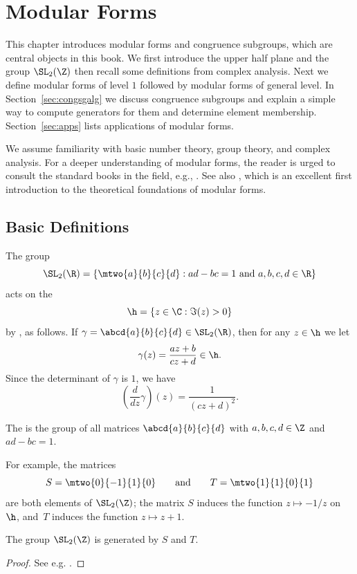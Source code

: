 \chapter{Modular Forms}\label{ch:modform}

This chapter introduces modular forms and congruence subgroups, which
are central objects in this book.  We first introduce the upper half
plane and the group $\SL_2(\Z)$ then recall some definitions from
complex analysis.  Next we define modular forms of level $1$ followed
by modular forms of general level.  In Section~\ref{sec:congsgalg} we
discuss congruence subgroups and explain a
simple way to compute generators for them and determine element
membership.  Section~\ref{sec:apps} lists applications of
modular forms.

We assume familiarity with basic number theory, group theory, and
complex analysis.  For a deeper understanding of modular forms, the
reader is urged to consult the standard books in the field, e.g.,
\cite{lang:modular, serre:arithmetic, diamond-im, miyake,
  shimura:intro, koblitz:cong}.  See also \cite{diamond-shurman},
which is an excellent first introduction to the theoretical
foundations of modular forms.


\section{Basic Definitions}
The group
$$
 \SL_2(\R) = 
\left\{ \mtwo{a}{b}{c}{d} : ad-bc=1\text{ and } a,b,c,d\in\R\right\}
$$
acts on the \index{$\h$}
$$
  \h = \{z \in \C : \Im(z) > 0\}
$$
by , as follows.
If
$\gamma = \abcd{a}{b}{c}{d} \in \SL_2(\R)$,
then for any $z\in\h$ we let
\begin{equation}\label{eqn:lft}
  \gamma(z) = \frac{az + b}{cz + d} \in \h.
\end{equation}
Since the determinant of $\gamma$ is $1$, we have
$$
   \left(\frac{d}{dz}\gamma\right)(z) = \frac{1}{(cz+d)^2}.
$$

\begin{definition}
The  is 
the group of
all matrices $\abcd{a}{b}{c}{d}$ with $a,b,c,d\in\Z$
and $ad-bc=1$.
\end{definition}
For example, the
matrices 
\begin{equation}\label{eqn:ST}
S=\mtwo{0}{-1}{1}{\hfill 0}
\qquad\text{and} \qquad
T=\mtwo{1}{1}{0}{1}
\end{equation} 
are both elements of $\SL_2(\Z)$;
the matrix $S$ induces the function $z\mapsto -1/z$ on~$\h$,
and~$T$ induces the function $z\mapsto z+1$.
\begin{theorem}\label{thm:sl2zgen}
The group $\SL_2(\Z)$ is generated by $S$ and $T$.
\end{theorem}
\begin{proof}
  See e.g. \cite[\S{}VII.1]{serre:arithmetic}.
\end{proof}

